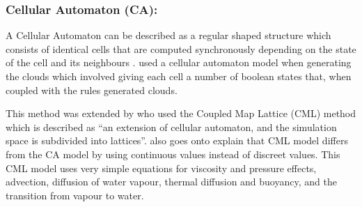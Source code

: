 \subsubsection{Cellular Automaton (CA):}
A Cellular Automaton can be described as a regular shaped structure which consists of identical cells that are computed synchronously depending on the state of the cell and its neighbours \citep{SDantchev11}.
\citet{DobashiEtAl00} used a cellular automaton model when generating the clouds which involved giving each cell a number of boolean states that, when coupled with the rules generated clouds.

This method was extended by \citet{Miyazaki01} who used the Coupled Map Lattice (CML) method which is described as “an extension of cellular automaton, and the simulation space is subdivided into lattices”.
\citet{Miyazaki01} also goes onto explain that CML model differs from the CA model by using continuous values instead of discreet values.
This CML model uses very simple equations for viscosity and pressure effects, advection, diffusion of water vapour, thermal diffusion and buoyancy, and the transition from vapour to water.